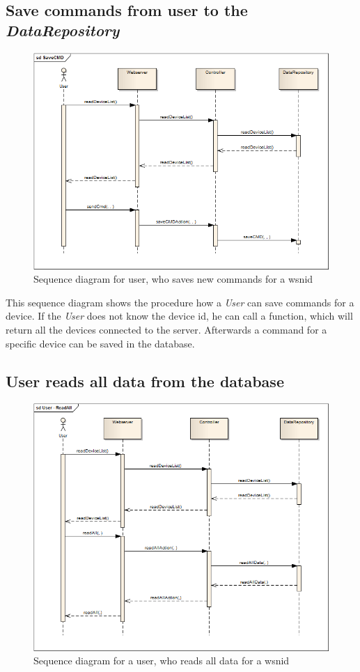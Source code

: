 \newpage\
\subsection{Save commands from user to the \textit{DataRepository}}
\begin{figure}[H]
	\centering
	\includegraphics[width=1.0\textwidth]{pic/SaveCMD.png}%
    \caption{Sequence diagram for user, who saves new commands for a wsnid}
    \label{SaveCMDpic}%
\end{figure}

This sequence diagram shows the procedure how a \textit{User} can save commands for a device. If the \textit{User} does not know the device id, he can call a function, which will return all the devices connected to the server. Afterwards a command for a specific device can be saved in the database.

\newpage
\subsection{User reads all data from the database}
\begin{figure}[H]
	\centering
	\includegraphics[width=1.0\textwidth]{pic/User-ReadAll.png}%
    \caption{Sequence diagram for a user, who reads all data for a wsnid}
    \label{UserReadAllpic}%
\end{figure}

